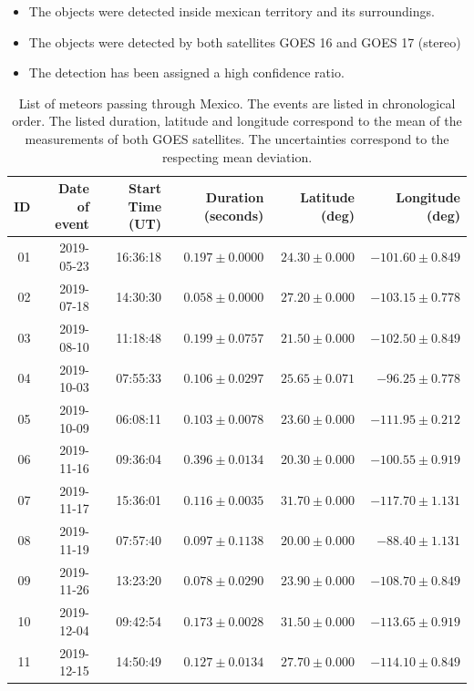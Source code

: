 \documentclass[times,twocolumn,final,authoryear]{elsarticle}
\begin{document}
\begin{itemize}
    \item The objects were detected inside mexican territory and its surroundings.
    \item The objects were detected by both satellites GOES 16 and GOES 17 (stereo)
    \item The detection has been assigned a high confidence ratio.
\end{itemize}



 



\begin{table}
  \centering
  \caption{List of meteors passing through Mexico. The events are listed in chronological order. The listed duration, latitude and longitude correspond to the mean of the measurements of both GOES satellites. The uncertainties correspond to the respecting mean deviation.}
\label{tab:table-meteors}
\begin{tabular}{rrrrrr}
\hline
ID & Date of event & Start Time (UT)  & Duration (seconds) & Latitude (deg) & Longitude (deg)\\
\hline
01 & 2019-05-23 & 16:36:18 & $0.197\pm 0.0000$ & $24.30 \pm 0.000$ & $-101.60 \pm 0.849$\\
02 & 2019-07-18 & 14:30:30 & $0.058\pm 0.0000$ & $27.20 \pm 0.000$ & $-103.15 \pm 0.778$\\
03 & 2019-08-10 & 11:18:48 & $0.199\pm 0.0757$ & $21.50 \pm 0.000$ & $-102.50  \pm 0.849$\\
04 & 2019-10-03 & 07:55:33 & $0.106\pm 0.0297$ & $25.65 \pm 0.071$ & $-96.25 \pm   0.778$\\
05 & 2019-10-09 & 06:08:11 & $0.103\pm 0.0078$ & $23.60 \pm 0.000$ & $-111.95 \pm  0.212$\\
06 & 2019-11-16 & 09:36:04 & $0.396\pm 0.0134$ & $20.30 \pm 0.000$ & $-100.55 \pm  0.919$\\
07 & 2019-11-17 & 15:36:01 & $0.116\pm 0.0035$ & $31.70 \pm 0.000$ & $-117.70 \pm  1.131$\\
08 & 2019-11-19 & 07:57:40 & $0.097\pm 0.1138$ & $20.00 \pm 0.000$ & $-88.40 \pm  1.131$\\
09 & 2019-11-26 & 13:23:20 & $0.078\pm 0.0290$ & $23.90 \pm 0.000$ & $-108.70 \pm  0.849$\\
10 & 2019-12-04 & 09:42:54 & $0.173\pm 0.0028$ & $31.50 \pm 0.000$ & $-113.65 \pm  0.919$\\
11 & 2019-12-15 & 14:50:49 & $0.127\pm 0.0134$ & $27.70 \pm 0.000$ & $-114.10 \pm  0.849$\\

\end{tabular}
\end{table}
\end{document}
